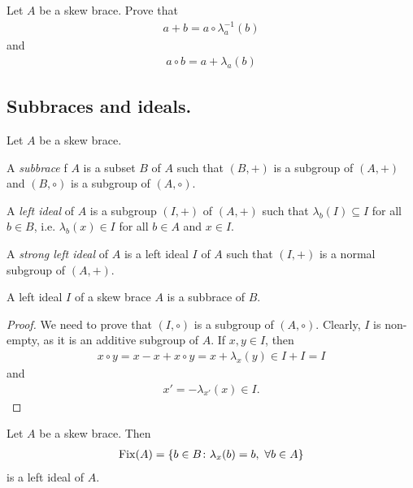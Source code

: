     \begin{exercise}\label{ex:sumprod}
        Let $A$ be a skew brace. Prove that 
        \begin{align*}
            a+b = a\circ\lambda^{-1}_{a}(b)
        \end{align*}
        and
        \begin{align*}
            a\circ b = a + \lambda_a(b)
        \end{align*}
    \end{exercise}


\subsection{Subbraces and ideals.}

    \begin{definition}
        Let $A$ be a skew brace. 

        A \emph{subbrace} f $A$ is a subset $B$ of $A$ such
        that $(B,+)$ is a subgroup of $(A,+)$ and $(B,\circ)$ is a subgroup of $(A,\circ)$.

        A \emph{left ideal} of $A$ is a subgroup $(I,+)$ of $(A,+)$ such that $\lambda_b(I) \subseteq I$ for all $b\in B$, i.e. $\lambda_b(x)\in I$ for all $b\in A$ and $x\in I$.

        A \emph{strong left ideal} of $A$ is a left ideal $I$ of $A$ such that $(I,+)$ is a normal subgroup of $(A,+)$.
    \end{definition}

    \begin{lemma}
        A left ideal $I$ of a skew brace $A$ is a subbrace of $B$.
    \end{lemma}

    \begin{proof}
        We need to prove that $(I,\circ)$ is a subgroup of $(A,\circ)$. 
        Clearly, $I$ is non-empty, as it is an additive subgroup of $A$. 
        If $x,y\in I$, then 
        \begin{align*}
            x\circ y = x - x+ x\circ y = x+\lambda_x(y) \in I + I = I
        \end{align*}
        and
        \begin{align*}
            x'=-\lambda_{x'}(x) \in I. 
        \end{align*}
    \end{proof}

    \begin{exercise}
    Let $A$ be a skew brace. Then
    \begin{align*}
        \operatorname{Fix}(A) = \{b \in B\colon \lambda_x(b)=b,\ \forall b\in A\}
    \end{align*}
    is a left ideal of $A$.
    \end{exercise}


